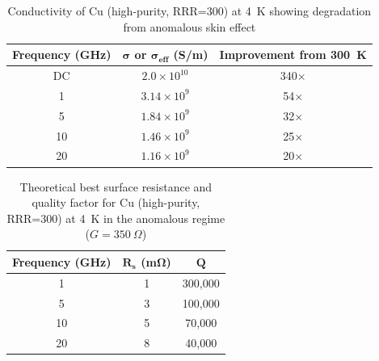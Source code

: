     \begin{table}[ht]
        \centering
        \caption{Conductivity of Cu (high-purity, RRR=300) at 4~K showing degradation from anomalous skin effect}
        \label{tab:sigma_eff_anomalous}
        \begin{tabular}{ccc}
        \toprule
        \textbf{Frequency (GHz)} & \textbf{$\bm{\sigma}$ or $\bm{\sigma_{\text{eff}}}$ (S/m)} & \textbf{Improvement from 300~K} \\
        \midrule
        DC & $2.0 \times 10^{10}$ & 340$\times$ \\
        \midrule
        1  & $3.14 \times 10^9$ & 54$\times$ \\
        5  & $1.84 \times 10^9$ & 32$\times$ \\
        10 & $1.46 \times 10^9$ & 25$\times$ \\
        20 & $1.16 \times 10^9$ & 20$\times$ \\
        \bottomrule
        \end{tabular}
    \end{table}


  \begin{table}[ht]
        \centering
        \caption{Theoretical best surface resistance and quality factor for Cu (high-purity, RRR=300) at 4~K in the anomalous regime ($G = 350~\Omega$)}
        \label{tab:Rs_Q_anomalous}
        \begin{tabular}{ccc}
        \toprule
        \textbf{Frequency (GHz)} & \textbf{$\bm{R_s}$ (m$\bm{\Omega}$)} & \textbf{$\bm{Q}$} \\
        \midrule
        1  & 1 & 300{,}000 \\
        5  & 3 & 100{,}000 \\
        10 & 5 & 70{,}000 \\
        20 & 8 & 40{,}000 \\
        \bottomrule
    \end{tabular}
    \end{table}


